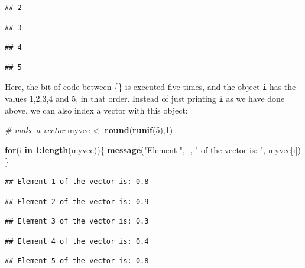 \documentclass[]{book}
\newenvironment{Shaded}{\begin{snugshade}}{\end{snugshade}}
\newcommand{\CommentTok}[1]{\textcolor[rgb]{0.56,0.35,0.01}{\textit{#1}}}
\newcommand{\ControlFlowTok}[1]{\textcolor[rgb]{0.13,0.29,0.53}{\textbf{#1}}}
\newcommand{\DecValTok}[1]{\textcolor[rgb]{0.00,0.00,0.81}{#1}}
\newcommand{\KeywordTok}[1]{\textcolor[rgb]{0.13,0.29,0.53}{\textbf{#1}}}
\newcommand{\NormalTok}[1]{#1}
\newcommand{\OperatorTok}[1]{\textcolor[rgb]{0.81,0.36,0.00}{\textbf{#1}}}
\newcommand{\StringTok}[1]{\textcolor[rgb]{0.31,0.60,0.02}{#1}}
\begin{document}
\begin{verbatim}
## 2
\end{verbatim}

\begin{verbatim}
## 3
\end{verbatim}

\begin{verbatim}
## 4
\end{verbatim}

\begin{verbatim}
## 5
\end{verbatim}

Here, the bit of code between \{\} is executed five times, and the object \texttt{i} has the values 1,2,3,4 and 5, in that order. Instead of just printing \texttt{i} as we have done above, we can also index a vector with this object:

\begin{Shaded}
\begin{Highlighting}[]
\CommentTok{# make a vector}
\NormalTok{myvec <-}\StringTok{ }\KeywordTok{round}\NormalTok{(}\KeywordTok{runif}\NormalTok{(}\DecValTok{5}\NormalTok{),}\DecValTok{1}\NormalTok{)}

\ControlFlowTok{for}\NormalTok{(i }\ControlFlowTok{in} \DecValTok{1}\OperatorTok{:}\KeywordTok{length}\NormalTok{(myvec))\{}
  \KeywordTok{message}\NormalTok{(}\StringTok{"Element "}\NormalTok{, i, }\StringTok{" of the vector is: "}\NormalTok{, myvec[i])}
\NormalTok{\}}
\end{Highlighting}
\end{Shaded}

\begin{verbatim}
## Element 1 of the vector is: 0.8
\end{verbatim}

\begin{verbatim}
## Element 2 of the vector is: 0.9
\end{verbatim}

\begin{verbatim}
## Element 3 of the vector is: 0.3
\end{verbatim}

\begin{verbatim}
## Element 4 of the vector is: 0.4
\end{verbatim}

\begin{verbatim}
## Element 5 of the vector is: 0.8
\end{verbatim}
\end{document}

